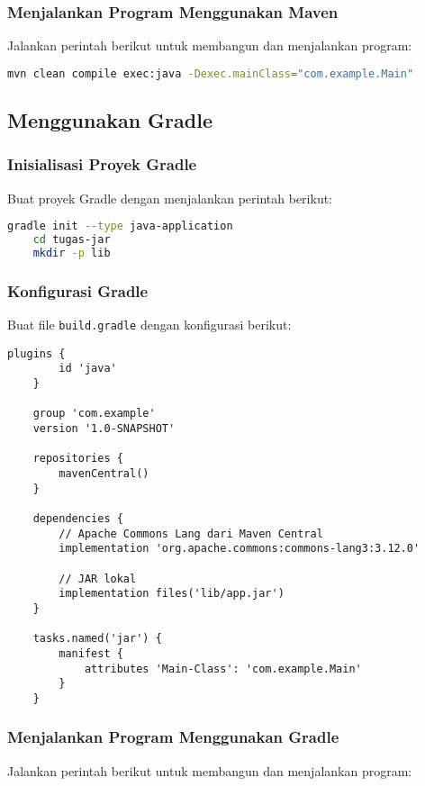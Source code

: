 \subsubsection{Menjalankan Program Menggunakan Maven}
Jalankan perintah berikut untuk membangun dan menjalankan program:

\begin{lstlisting}[language=bash]
	mvn clean compile exec:java -Dexec.mainClass="com.example.Main"
\end{lstlisting}

\subsection{Menggunakan Gradle}
\subsubsection{Inisialisasi Proyek Gradle}
Buat proyek Gradle dengan menjalankan perintah berikut:

\begin{lstlisting}[language=bash]
	gradle init --type java-application
	cd tugas-jar
	mkdir -p lib
\end{lstlisting}

\subsubsection{Konfigurasi Gradle}
Buat file \texttt{build.gradle} dengan konfigurasi berikut:

\begin{lstlisting}[style=XmlStyle]
	plugins {
		id 'java'
	}
	
	group 'com.example'
	version '1.0-SNAPSHOT'
	
	repositories {
		mavenCentral()
	}
	
	dependencies {
		// Apache Commons Lang dari Maven Central
		implementation 'org.apache.commons:commons-lang3:3.12.0'
		
		// JAR lokal
		implementation files('lib/app.jar')
	}
	
	tasks.named('jar') {
		manifest {
			attributes 'Main-Class': 'com.example.Main'
		}
	}
\end{lstlisting}

\subsubsection{Menjalankan Program Menggunakan Gradle}
Jalankan perintah berikut untuk membangun dan menjalankan program:

